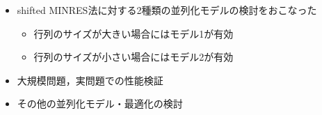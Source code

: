 

\begin{itemize}
	\item shifted MINRES法に対する2種類の並列化モデルの検討をおこなった
		\begin{itemize}
			\item 行列のサイズが大きい場合にはモデル1が有効
			\item 行列のサイズが小さい場合にはモデル2が有効
		\end{itemize}
	\item 大規模問題，実問題での性能検証
	\item その他の並列化モデル・最適化の検討
\end{itemize}